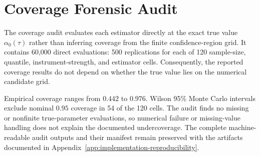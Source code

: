 \section{Coverage Forensic Audit}
\label{app:coverage-forensic-audit}

The coverage audit evaluates each estimator directly at the exact true value $\alpha_0(\tau)$ rather than inferring coverage from the finite confidence-region grid. It contains 60,000 direct evaluations: 500 replications for each of 120 sample-size, quantile, instrument-strength, and estimator cells. Consequently, the reported coverage results do not depend on whether the true value lies on the numerical candidate grid.

Empirical coverage ranges from $0.442$ to $0.976$. Wilson 95\% Monte Carlo intervals exclude nominal $0.95$ coverage in 54 of the 120 cells. The audit finds no missing or nonfinite true-parameter evaluations, so numerical failure or missing-value handling does not explain the documented undercoverage. The complete machine-readable audit outputs and their manifest remain preserved with the artifacts documented in Appendix~\ref{app:implementation-reproducibility}.
